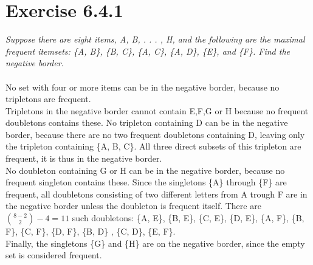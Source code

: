 \documentclass{article}
\begin{document}
\section*{Exercise 6.4.1}
\textit{Suppose there are eight items, A, B, . . . , H, and the following
are the maximal frequent itemsets: \{A, B\}, \{B, C\}, \{A, C\}, \{A, D\}, \{E\}, and
\{F\}. Find the negative border.}
\\
\\
No set with four or more items can be in the negative border, because no tripletons are frequent.\\
Tripletons in the negative border cannot contain E,F,G or H because no frequent doubletons contains these.
No tripleton containing D can be in the negative border, because there are no two frequent doubletons containing D, leaving only the tripleton containing \{A, B, C\}.
All three direct subsets of this tripleton are frequent, it is thus in the negative border.\\
No doubleton containing G or H can be in the negative border, because no frequent singleton contains these. Since the singletons \{A\} through \{F\} are frequent, all doubletons consisting of two different letters from A trough F are in the negative border unless the doubleton is frequent itself. There are $\binom{8-2}{2} - 4 = 11$ such doubletons:
\{A, E\}, \{B, E\}, \{C, E\}, \{D, E\},
\{A, F\}, \{B, F\}, \{C, F\}, \{D, F\},
\{B, D\} , \{C, D\}, \{E, F\}.\\
Finally, the singletons \{G\} and \{H\} are on the negative border, since the empty set is considered frequent.
\end{document}
